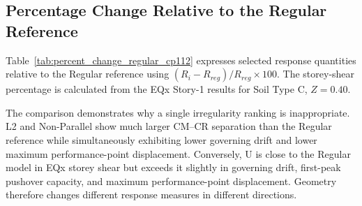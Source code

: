 \subsection{Percentage Change Relative to the Regular Reference}
Table~\ref{tab:percent_change_regular_cp112} expresses selected response quantities relative to the Regular reference using $(R_i-R_{reg})/R_{reg}\times100$. The storey-shear percentage is calculated from the EQx Story-1 results for Soil Type C, $Z=0.40$.

\begin{table}[!htbp]
\centering
\caption{Percentage change from the Regular reference for selected response quantities.}
\label{tab:percent_change_regular_cp112}
\scriptsize
{}
\end{table}

The comparison demonstrates why a single irregularity ranking is inappropriate. L2 and Non-Parallel show much larger CM--CR separation than the Regular reference while simultaneously exhibiting lower governing drift and lower maximum performance-point displacement. Conversely, U is close to the Regular model in EQx storey shear but exceeds it slightly in governing drift, first-peak pushover capacity, and maximum performance-point displacement. Geometry therefore changes different response measures in different directions.

